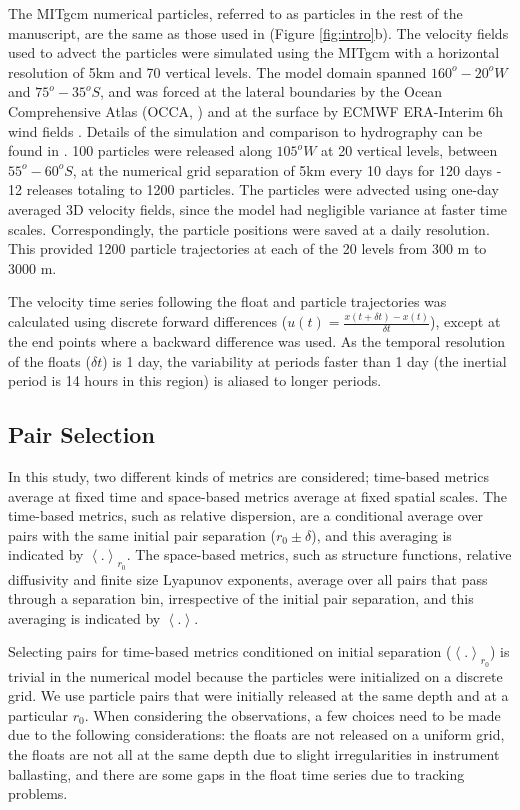 \documentclass[]{ametsoc}
\begin{document}
The MITgcm numerical particles, referred to as particles in the rest of the manuscript, are the same as those used in \cite{lacasce2014} (Figure \ref{fig:intro}b). The velocity fields used to advect the particles were simulated using the MITgcm with a horizontal resolution of 5km and 70 vertical levels. The model domain spanned $160^o - 20^oW$ and  $75^o -35^oS$, and was forced at the lateral boundaries by the Ocean Comprehensive Atlas (OCCA, \cite{forget2010mapping}) and at the surface by ECMWF ERA-Interim 6h wind fields \citep{berrisford2009era}. Details of the simulation and comparison to hydrography can be found in \cite{tulloch2014direct}. 100 particles were released along $105^oW$ at 20 vertical levels, between $55^o-60^oS$, at the numerical grid separation of 5km every 10 days for 120 days - 12 releases totaling to 1200 particles. The particles were advected using one-day averaged 3D velocity fields, since the model had negligible variance at faster time scales. Correspondingly, the particle positions were saved at a daily resolution. This provided 1200 particle trajectories at each of the 20 levels from 300 m to 3000 m. 

The velocity time series following the float and particle trajectories was calculated using discrete forward differences ($u(t) = \frac{x(t+\delta t) - x(t)}{\delta t}$), except at the end points where a backward difference was used. As the temporal resolution of the floats ($\delta t$) is 1 day, the variability at periods faster than 1 day (the inertial period is 14 hours in this region) is aliased to longer periods. 

\subsection{Pair Selection}
In this study, two different kinds of metrics are considered; time-based metrics average at fixed time and space-based metrics average at fixed spatial scales. The time-based metrics, such as relative dispersion, are a conditional average over pairs with the same initial pair separation ($r_0 \pm \delta$), and this averaging is indicated by $\left<. \right>_{r_0}$. The space-based metrics, such as structure functions, relative diffusivity and finite size Lyapunov exponents, average over all pairs that pass through a separation bin, irrespective of the initial pair separation, and this averaging is indicated by $\left<. \right>$. 

Selecting pairs for time-based metrics conditioned on initial separation ($\left<. \right>_{r_0}$) is trivial in the numerical model because the particles were initialized on a discrete grid. We use particle pairs that were initially released at the same depth and at a particular $r_0$. When considering the observations, a few choices need to be made due to the following considerations: the floats are not released on a uniform grid, the floats are not all at the same depth due to slight irregularities in instrument ballasting, and there are some gaps in the float time series due to tracking problems. 
\end{document}
